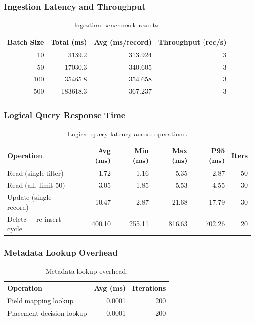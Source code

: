 \documentclass[12pt,a4paper]{article}
\begin{document}
\subsubsection{Ingestion Latency and Throughput}
\begin{table}[H]
\centering
\begin{tabular}{r r r r}
\toprule
\textbf{Batch Size} & \textbf{Total (ms)} & \textbf{Avg (ms/record)} & \textbf{Throughput (rec/s)} \\
\midrule
10 & 3139.2 & 313.924 & 3 \\
50 & 17030.3 & 340.605 & 3 \\
100 & 35465.8 & 354.658 & 3 \\
500 & 183618.3 & 367.237 & 3 \\
\bottomrule
\end{tabular}
\caption{Ingestion benchmark results.}
\end{table}

\subsubsection{Logical Query Response Time}
\begin{table}[H]
\centering
\begin{tabular}{l r r r r r}
\toprule
\textbf{Operation} & \textbf{Avg (ms)} & \textbf{Min (ms)} & \textbf{Max (ms)} & \textbf{P95 (ms)} & \textbf{Iters} \\
\midrule
Read (single filter) & 1.72 & 1.16 & 5.35 & 2.87 & 50 \\
Read (all, limit 50) & 3.05 & 1.85 & 5.53 & 4.55 & 30 \\
Update (single record) & 10.47 & 2.87 & 21.68 & 17.79 & 30 \\
Delete + re-insert cycle & 400.10 & 255.11 & 816.63 & 702.26 & 20 \\
\bottomrule
\end{tabular}
\caption{Logical query latency across operations.}
\end{table}

\subsubsection{Metadata Lookup Overhead}
\begin{table}[H]
\centering
\begin{tabular}{l r r}
\toprule
\textbf{Operation} & \textbf{Avg (ms)} & \textbf{Iterations} \\
\midrule
Field mapping lookup & 0.0001 & 200 \\
Placement decision lookup & 0.0001 & 200 \\
\bottomrule
\end{tabular}
\caption{Metadata lookup overhead.}
\end{table}
\end{document}
